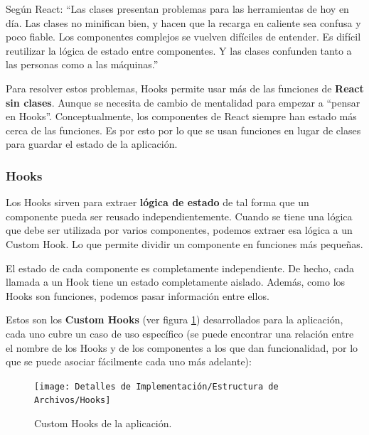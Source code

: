 \documentclass[12pt,twoside,titlepage]{report}
\begin{document}
Según React: ``Las clases presentan problemas para las herramientas de hoy en día. Las clases no minifican bien, y hacen que la recarga en caliente sea confusa y poco fiable. Los componentes complejos se vuelven difíciles de entender. Es difícil reutilizar la lógica de estado entre componentes. Y las clases confunden tanto a las personas como a las máquinas.'' 

Para resolver estos problemas, Hooks permite usar más de las funciones de \textbf{React sin clases}. Aunque se necesita de cambio de mentalidad para empezar a “pensar en Hooks”. Conceptualmente, los componentes de React siempre han estado más cerca de las funciones. Es por esto por lo que se usan funciones en lugar de clases para guardar el estado de la aplicación.
\cite{hooks1}

\subsubsection{Hooks}

Los Hooks sirven para extraer \textbf{lógica de estado} de tal forma que un componente pueda ser reusado independientemente. Cuando se tiene una lógica que debe ser utilizada por varios componentes, podemos extraer esa lógica a un Custom Hook. Lo que permite dividir un componente en funciones más pequeñas.
\cite{hooks3}

El estado de cada componente es completamente independiente. De hecho, cada llamada a un Hook tiene un estado completamente aislado. Además, como los Hooks son funciones, podemos pasar información entre ellos.
\cite{hooks2}

Estos son los \textbf{Custom Hooks} (ver figura \ref{fig:Hooks}) desarrollados para la aplicación, cada uno cubre un caso de uso específico (se puede encontrar una relación entre el nombre de los Hooks y de los componentes a los que dan funcionalidad, por lo que se puede asociar fácilmente cada uno más adelante):

\begin{figure}[H]
    \centering
    \texttt{[image: Detalles de Implementación/Estructura de Archivos/Hooks]}
    \caption{Custom Hooks de la aplicación.}
    \label{fig:Hooks}
\end{figure}
\end{document}
